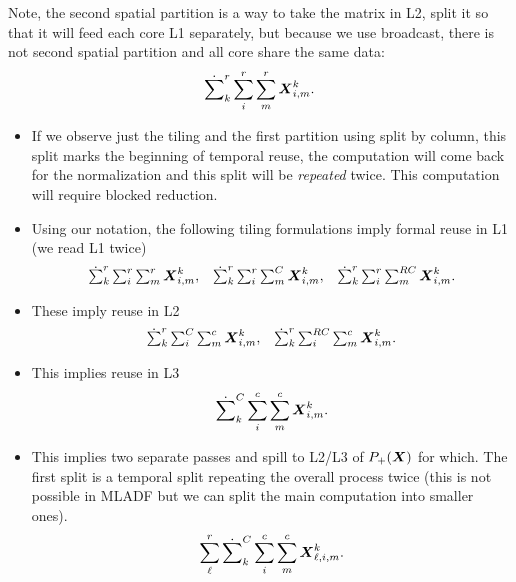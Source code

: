 \documentclass[acmsmall]{acmart}
\begin{document}
Note, the second spatial partition is a way to take the matrix in L2,
split it so that it will feed each core L1 separately, but because we
use broadcast, there is not second spatial partition and all core
share the same data:
\begin{equation}
\dot\sum_k^r\sum_{i}^r\sum_{m}^r{\boldsymbol X}^{k}_{i,m}.
\end{equation}

\begin{itemize}
\item If we observe just the tiling and the first partition using
  split by column, this split marks the beginning of temporal reuse,
  the computation will come back for the normalization and this split
  will be {\em repeated} twice. This computation will require blocked
  reduction.

\item Using our notation, the following tiling formulations imply
  formal reuse in L1 (we read L1 twice)
  \begin{equation}
    \begin{matrix}
    \dot\sum_k^r\sum_{i}^r\sum_{m}^r{\boldsymbol X}^{k}_{i,m}, & 
    \dot\sum_k^r\sum_{i}^r\sum_{m}^C{\boldsymbol X}^{k}_{i,m}, & 
    \dot\sum_k^r\sum_{i}^r\sum_{m}^{RC}{\boldsymbol X}^{k}_{i,m}. \\
    \end{matrix}
  \end{equation}
  
\item These imply reuse in L2
  \begin{equation}
    \begin{matrix}
    \dot\sum_k^r\sum_{i}^{C}\sum_{m}^c{\boldsymbol X}^{k}_{i,m}, & 
    \dot\sum_k^r\sum_{i}^{RC}\sum_{m}^c{\boldsymbol X}^{k}_{i,m}. \\
    \end{matrix}
  \end{equation}

\item This implies reuse in L3
  \begin{equation}
    \dot\sum_k^{C}\sum_{i}^c\sum_{m}^c{\boldsymbol X}^{k}_{i,m}.
  \end{equation}

\item This implies two separate passes and spill to L2/L3 of
  $P_+({\boldsymbol X})$ for which. The first split is a temporal split
  repeating the overall process twice (this is not possible in MLADF
  but we can split the main computation into smaller ones).
  \begin{equation}
    \sum_\ell^{r}\dot\sum_k^{C}\sum_{i}^c\sum_{m}^c{\boldsymbol X}^{k}_{\ell,i,m}.
  \end{equation}
\end{itemize}
\end{document}
